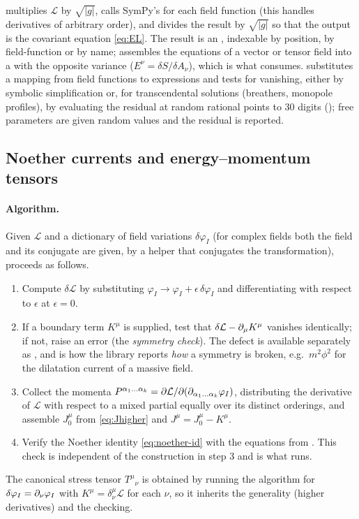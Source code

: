  multiplies $\mathcal L$ by $\sqrt{|g|}$, calls SymPy's  for each field function (this handles derivatives of arbitrary order), and divides the result by $\sqrt{|g|}$ so that the output is the covariant equation \cref{eq:EL}. The result is an , indexable by position, by field-function or by name;  assembles the equations of a vector or tensor field into a  with the opposite variance ($E^\nu=\delta S/\delta A_\nu$), which is what  consumes.  substitutes a mapping from field functions to expressions and tests for vanishing, either by symbolic simplification or, for transcendental solutions (breathers, monopole profiles), by evaluating the residual at random rational points to $30$ digits (); free parameters are given random values and the residual is reported.

\subsection{Noether currents and energy--momentum tensors}
\label{sec:noether}

\paragraph{Algorithm.} Given $\mathcal L$ and a dictionary of field variations $\delta\varphi_I$ (for complex fields both the field and its conjugate are given, by a helper that conjugates the transformation),  proceeds as follows.
\begin{enumerate}[nosep]
\item Compute $\delta\mathcal L$ by substituting $\varphi_I\to\varphi_I+\epsilon\,\delta\varphi_I$ and differentiating with respect to $\epsilon$ at $\epsilon=0$.
\item If a boundary term $K^\mu$ is supplied, test that $\delta\mathcal L-\partial_\mu K^\mu$ vanishes identically; if not, raise an error (the \emph{symmetry check}). The defect is available separately as , and is how the library reports \emph{how} a symmetry is broken, e.g.\ $m^2\phi^2$ for the dilatation current of a massive field.
\item Collect the momenta $P^{\alpha_1\ldots\alpha_k}=\partial\mathcal L/\partial(\partial_{\alpha_1\ldots\alpha_k}\varphi_I)$, distributing the derivative of $\mathcal L$ with respect to a mixed partial equally over its distinct orderings, and assemble $J_0^\mu$ from \cref{eq:Jhigher} and $J^\mu=J_0^\mu-K^\mu$.
\item Verify the Noether identity \cref{eq:noether-id} with the equations from . This check is independent of the construction in step 3 and is what  runs.
\end{enumerate}
The canonical stress tensor $T^\mu{}_\nu$ is obtained by running the algorithm for $\delta\varphi_I=\partial_\nu\varphi_I$ with $K^\mu=\delta^\mu_\nu\mathcal L$ for each $\nu$, so it inherits the generality (higher derivatives) and the checking.

